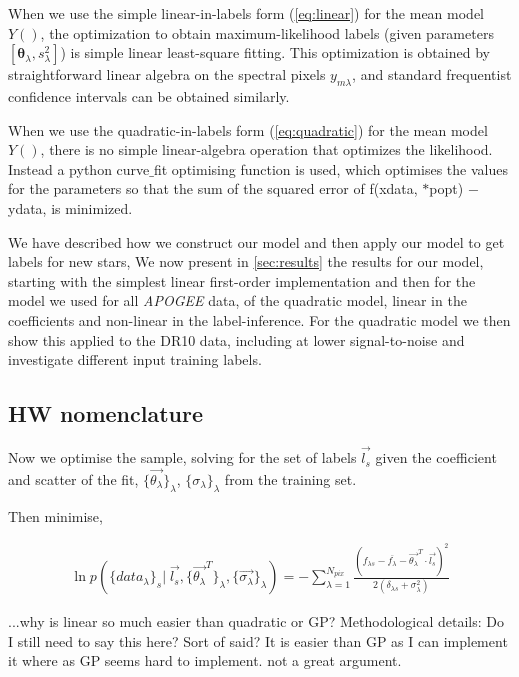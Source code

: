 \documentclass[12pt, preprint]{aastex}
\newcommand{\set}[1]{\bm{#1}}
\newcommand{\mean}[1]{\overline{#1}}
\begin{document}
When we use the simple linear-in-labels form (\ref{eq:linear}) for the
mean model $Y()$, the optimization to obtain maximum-likelihood labels
(given parameters $[\set{\theta}_\lambda, s_\lambda^2]$) is simple linear
least-square fitting.
This optimization is obtained by straightforward linear algebra on the
spectral pixels $y_{m\lambda}$, and standard frequentist confidence
intervals can be obtained similarly.

When we use the quadratic-in-labels form (\ref{eq:quadratic}) for the
mean model $Y()$, there is no simple linear-algebra operation that
optimizes the likelihood. Instead a python curve$\_$fit optimising function is used, which optimises the values for the parameters so that the sum of the squared error of f(xdata, $*$popt) $-$ ydata,  is minimized. 

We have described how we construct our model and then apply our model to get labels for new stars, We now present in \ref{sec:results} the results for our model, starting with the simplest linear first-order implementation and then for the model we used for all \textit{APOGEE} data, of the quadratic model, linear in the coefficients and non-linear in the label-inference.  For the quadratic model we then show this applied to the DR10 data, including at lower signal-to-noise and investigate different input training labels. 

\subsection{HW nomenclature}

Now we optimise the sample, solving for the set of labels $\vec{l_s}$ given the coefficient and scatter of the fit, $ \{ \vec{\theta_\lambda} \}_\lambda $, 
$\{ \sigma_\lambda \}_\lambda$ from the training set. 

Then minimise, 

 \begin{eqnarray}
\ln p ( \{ data_\lambda \}_s | \; \vec{l_s}, \{ \vec{\theta_\lambda }^T \}_\lambda, \{ \vec{\sigma_\lambda }\}_\lambda )  = 
- \sum\limits_{\lambda=1}^{N_{pix}}  \frac{(f_{\lambda s } - \mean{f_\lambda} - \vec{\theta_\lambda }^T  \cdot \vec{l_s})^2} {2(\delta_{\lambda s} + \sigma_\lambda^{2})}
\end{eqnarray}


...why is linear so much easier than quadratic or GP?  Methodological details: Do I still need to say this here? Sort of said? It is easier than GP as I can implement it where as GP seems hard to implement. not a great argument. 
\end{document}
